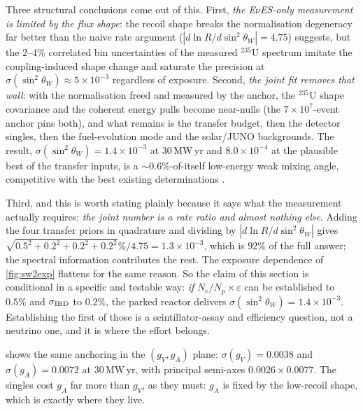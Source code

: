 \documentclass[aps,prd,superscriptaddress,nofootinbib,longbibliography,notitlepage,11pt]{revtex4-2}
\newcommand{\eves}{E$\nu$ES}
\newcommand{\sw}{\sin^2\theta_W}
\newcommand{\MWyr}{\mathrm{MW\,yr}}
\begin{document}
Three structural conclusions come out of this.  First, \emph{the \eves{}-only measurement is
limited by the flux shape}: the recoil shape breaks the normalisation degeneracy far better
than the naive rate argument ($|d\ln R/d\sw|=4.75$) suggests, but the $2$--$4\%$
correlated bin uncertainties of the measured $^{235}$U spectrum imitate the coupling-induced
shape change and saturate the precision at $\sigma(\sw)\approx5\times10^{-3}$ regardless of
exposure.  Second, \emph{the joint fit removes that wall}: with the normalisation freed and
measured by the anchor, the $^{235}$U shape covariance and the coherent energy pulls become
near-nulls (the $7\times10^7$-event anchor pins both), and what remains is the transfer
budget, then the detector singles, then the fuel-evolution mode and the solar/JUNO
backgrounds.  The result, $\sigma(\sw)=1.4\times10^{-3}$ at $30\,\MWyr$ and
$8.0\times10^{-4}$ at the plausible best of the transfer inputs, is a
$\sim0.6\%$-of-itself low-energy weak mixing angle, competitive with the best existing
determinations \cite{Erler:2004in}.

Third, and this is worth stating plainly because it says what the measurement actually
requires: \emph{the joint number is a rate ratio and almost nothing else}.  Adding the four
transfer priors in quadrature and dividing by $|d\ln R/d\sw|$ gives
$\sqrt{0.5^2+0.2^2+0.2^2+0.2^2}\%/4.75=1.3\times10^{-3}$, which is $92\%$ of the full
answer; the spectral information contributes the rest.  The exposure dependence of
\cref{fig:sw2exp} flattens for the same reason.  So the claim of this section is
conditional in a specific and testable way: \emph{if} $N_e/N_p\times\varepsilon$ can be
established to $0.5\%$ and $\sigma_{\rm IBD}$ to $0.2\%$, the parked reactor delivers
$\sigma(\sw)=1.4\times10^{-3}$.  Establishing the first of those is a scintillator-assay
and efficiency question, not a neutrino one, and it is where the effort belongs.

 shows the same anchoring in the $(g_V,g_A)$ plane: $\sigma(g_V)=0.0038$ and
$\sigma(g_A)=0.0072$ at $30\,\MWyr$, with principal semi-axes $0.0026\times0.0077$.  The
singles cost $g_A$ far more than $g_V$, as they must: $g_A$ is fixed by the low-recoil
shape, which is exactly where they live.
\end{document}
